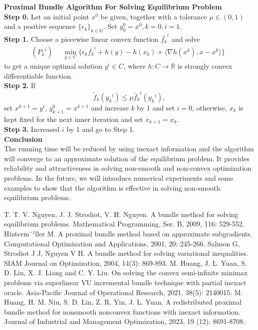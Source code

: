 \documentclass[12pt]{llncs}
\begin{document}
\newpage\noindent\textbf{Proximal Bundle Algorithm For Solving Equilibrium Problem}\\
\noindent \textbf{Step 0.} Let an initial point $x^{0}$ be given, together with a tolerance $\mu\in(0,1)$ and a positive sequence $\{\epsilon_{k}\}_{k\in\mathbb{N} }$. Set $y_{0}^{0}=x^{0}, k=0,i=1$.\\
\noindent \textbf{Step 1.} Choose a piecewise linear convex function $\bar{{f}_{k}}^{i}$ and solve
$$
({{P}_{k}}^{i})\quad \begin{aligned}
\min_{y \in C}  \{\epsilon_{k}\bar{{f}_{k}}^{i}+ h(y)-h(x_{k})+\langle\nabla h(x^{k}),x-x^{k}\rangle\}
\end{aligned}
$$
to get a unique optimal solution $y^{i}\in C$, where $h:C\rightarrow\mathbb{R} $ is strongly convex differentiable function.\\
\textbf{Step 2.} If
$${\tilde{f}_{k}}({y_{k}}^{i})\leq\mu{\bar{f}_{k}}^{i}({y_{k}}^{i}),$$
set $x^{k+1}=y^{i}$, $y_{k+1}^{0}=x^{k+1}$ and increase $k$ by 1 and set $i=0$, otherwise, $ x_k$ is kept fixed for the next inner iteration and set $x_{k+1}=x_k$.\\
\textbf{Step 3.}  Increased $i$ by 1 and go to Step 1.\\
\noindent\textbf{Conclusion}\\
\indent The running time will be reduced by using inexact information and the algorithm will converge to an approximate solution of the equilibrium problem. It provides reliability and attractiveness in solving non-smooth and non-convex optimization problems. In the future, we will introduce numerical experiments and some examples to show that the algorithm is effective in solving non-smooth equilibrium problems.

\begin{thebibliography}{9} %
 T. T. V. Nguyen, J. J. Strodiot, V. H. Nguyen. A bundle method for solving equilibrium problems. Mathematical Programming, Ser. B, 2009, 116: 529-552.
 Hinterm¨¹ller M. A proximal bundle method based on approximate subgradients. Computational Optimization and Applications, 2001, 20: 245-266.
 Salmon G, Strodiot J J, Nguyen V H. A bundle method for solving variational inequalities. SIAM Journal on Optimization, 2004, 14(3): 869-893.
 M. Huang, J. L. Yuan, S. D. Lin, X. J. Liang and C. Y. Liu. On solving the convex semi-infinite minimax problems via superlinear VU incremental bundle technique with partial inexact oracle. Asia-Pacific Journal of Operational Research, 2021, 38(5): 2140015.
 M. Huang, H. M. Niu, S. D. Lin, Z. R. Yin, J. L. Yuan. A redistributed proximal bundle method for nonsmooth nonconvex functions with inexact information. Journal of Industrial and Management Optimization, 2023, 19 (12): 8691-8708.

\end{thebibliography}
\end{document}
